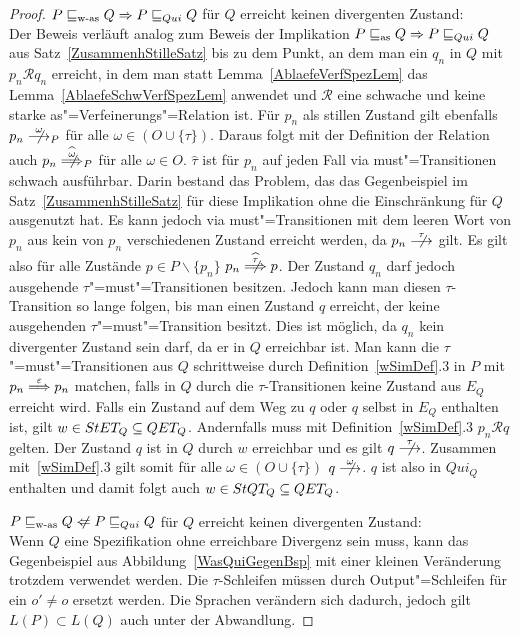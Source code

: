 \begin{proof}
  $P \sqsubseteq _{\mathrm{w}\text{-}\mathrm{as}} Q \Rightarrow P  \sqsubseteq  _{Qui} Q$ für $Q$ erreicht keinen divergenten
  Zustand:\\
  Der Beweis verläuft analog zum Beweis der Implikation $P \sqsubseteq _{\mathrm{as}} Q \Rightarrow
  P  \sqsubseteq  _{Qui} Q$ aus Satz~\ref{ZusammenhStilleSatz} bis zu dem Punkt, an dem man
  ein $q_n$ in $Q$ mit $p_n \mathcal{R} q_n$ erreicht, in dem man statt
  Lemma~\ref{AblaefeVerfSpezLem} das Lemma~\ref{AblaefeSchwVerfSpezLem}
  anwendet und $\mathcal{R}$ eine schwache und keine starke
  as"=Verfeinerungs"=Relation ist. Für $p_n$ als stillen Zustand gilt ebenfalls
  $p_n \nmust[\omega]_P$ für alle $\omega\in (O\cup\{\tau\})$. Daraus folgt mit
  der Definition der Relation \weakmust{} auch $p_n
  \nweakmust[\widehat{\omega}]_P$ für alle $\omega\in O$. $\widehat{\tau}$ ist
  für $p_n$ auf jeden Fall via \glqq must"=Transitionen\grqq{} schwach
  ausführbar. Darin bestand das Problem, das das Gegenbeispiel im
  Satz~\ref{ZusammenhStilleSatz} für diese Implikation ohne die Einschränkung
  für $Q$ ausgenutzt hat. Es kann jedoch via must"=Transitionen mit dem leeren
  Wort von $p_n$ aus kein von $p_n$ verschiedenen Zustand erreicht werden, da
  $p_n \nmust[\tau]$ gilt. Es gilt also für alle Zustände $p\in P\backslash
  \{p_n\}$ $p_n \nweakmust[\widehat{\tau}] p$. Der Zustand $q_n$ darf jedoch
  ausgehende $\tau$"=must"=Transitionen besitzen. Jedoch kann man diesen
  $\tau$-Transition so lange folgen, bis man einen Zustand $q$ erreicht, der
  keine ausgehenden $\tau$"=must"=Transition besitzt. Dies ist möglich, da
  $q_n$ kein divergenter Zustand sein darf, da er in $Q$ erreichbar ist. Man
  kann die $\tau$"=must"=Transitionen aus $Q$ schrittweise durch
  Definition~\ref{wSimDef}.3 in $P$ mit $p_n \weakmust[\varepsilon] p_n$
  matchen, falls in $Q$ durch die $\tau$-Transitionen keine Zustand aus $E_Q$
  erreicht wird. Falls ein Zustand auf dem Weg zu $q$ oder $q$ selbst in $E_Q$
  enthalten ist, gilt $w\in StET _Q \subseteq QET _Q$. Andernfalls muss mit
  Definition~\ref{wSimDef}.3 $p_n\mathcal{R} q$ gelten. Der Zustand $q$ ist in
  $Q$ durch $w$ erreichbar und es gilt $q \nmust[\tau]$. Zusammen
  mit~\ref{wSimDef}.3 gilt somit für alle $\omega \in (O\cup \{\tau\})$ $q
  \nmust[\omega]$. $q$ ist also in $Qui_Q$ enthalten und damit folgt auch $w
  \in StQT _Q\subseteq QET _Q$.

  $P \wasRel Q \hspace{0.1cm}\not\hspace{-0.1cm}\Leftarrow P \QRel Q$ für $Q$
  erreicht keinen divergenten Zustand:\\
  Wenn $Q$ eine Spezifikation ohne erreichbare Divergenz sein muss, kann das
  Gegenbeispiel aus Abbildung~\ref{WasQuiGegenBsp} mit einer kleinen
  Veränderung trotzdem verwendet werden. Die $\tau$-Schleifen müssen durch
  Output"=Schleifen für ein $o'\neq o$ ersetzt werden. Die Sprachen verändern
  sich dadurch, jedoch gilt $L(P) \subset L(Q)$ auch unter der Abwandlung.
\end{proof}
